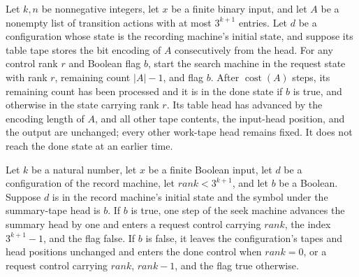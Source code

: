 \begin{lemma}
\label{Turing.StepBlock.seekTM_many}
\leanok
{}
Let $k,n$ be nonnegative integers, let $x$ be a finite binary input, and let $A$ be a
nonempty list of transition actions with at most $3^{k+1}$ entries. Let $d$ be a
configuration whose state is the recording machine's initial state, and suppose its
table tape stores the bit encoding of $A$ consecutively from the head. For any control
rank $r$ and Boolean flag $b$, start the search machine in the request state with rank
$r$, remaining count $|A|-1$, and flag $b$. After $\operatorname{cost}(A)$ steps, its
remaining count has been processed and it is in the done state if $b$ is true, and
otherwise in the state carrying rank $r$. Its table head has advanced by the encoding
length of $A$, and all other tape contents, the input-head position, and the output are
unchanged; every other work-tape head remains fixed. It does not reach the done state at
an earlier time.
\end{lemma}

\begin{lemma}
\label{Turing.StepBlock.seekTM_stateStep}
\leanok
{}
Let $k$ be a natural number, let $x$ be a finite Boolean input, let $d$ be a
configuration of the record machine, let $rank<3^{k+1}$, and let $b$ be a Boolean.
Suppose $d$ is in the record machine's initial state and the symbol under the
summary-tape head is $b$. If $b$ is true, one step of the seek machine advances the
summary head by one and enters a request control carrying $rank$, the index $3^{k+1}-1$,
and the flag false. If $b$ is false, it leaves the configuration's tapes and head
positions unchanged and enters the done control when $rank=0$, or a request control
carrying $rank$, $rank-1$, and the flag true otherwise.
\end{lemma}

